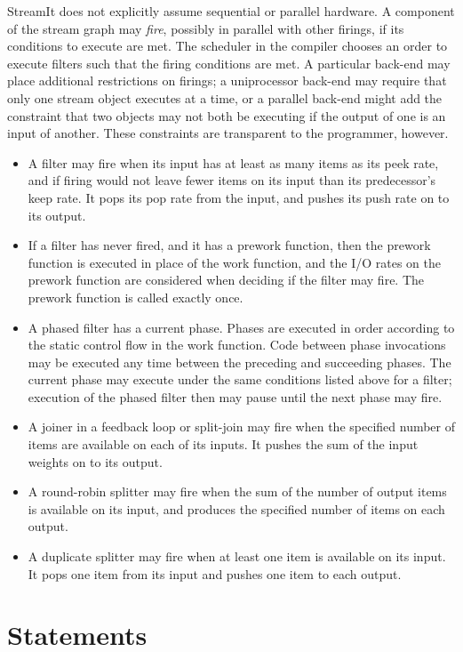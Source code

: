\documentclass[11pt]{article}
\begin{document}
StreamIt does not explicitly assume sequential or parallel hardware.
A component of the stream graph may \emph{fire}, possibly in parallel
with other firings, if its conditions to execute are met.  The
scheduler in the compiler chooses an order to execute filters such
that the firing conditions are met.  A particular back-end may place
additional restrictions on firings; a uniprocessor back-end may
require that only one stream object executes at a time, or a parallel
back-end might add the constraint that two objects may not both be
executing if the output of one is an input of another.  These
constraints are transparent to the programmer, however.

\begin{itemize}
\item A filter may fire when its input has at least as many items as
  its peek rate, and if firing would not leave fewer items on its
  input than its predecessor's keep rate.  It pops its pop rate from
  the input, and pushes its push rate on to its output.
\item If a filter has never fired, and it has a prework function, then
  the prework function is executed in place of the work function, and
  the I/O rates on the prework function are considered when deciding
  if the filter may fire.  The prework function is called exactly once.
\item A phased filter has a current phase.  Phases are executed in
  order according to the static control flow in the work function.
  Code between phase invocations may be executed any time between the
  preceding and succeeding phases.  The current phase may execute
  under the same conditions listed above for a filter; execution of
  the phased filter then may pause until the next phase may fire.
\item A joiner in a feedback loop or split-join may fire when the
  specified number of items are available on each of its inputs.  It
  pushes the sum of the input weights on to its output.
\item A round-robin splitter may fire when the sum of the number of
  output items is available on its input, and produces the specified
  number of items on each output.
\item A duplicate splitter may fire when at least one item is
  available on its input.  It pops one item from its input and pushes
  one item to each output.
\end{itemize}

\section{Statements}
\end{document}
